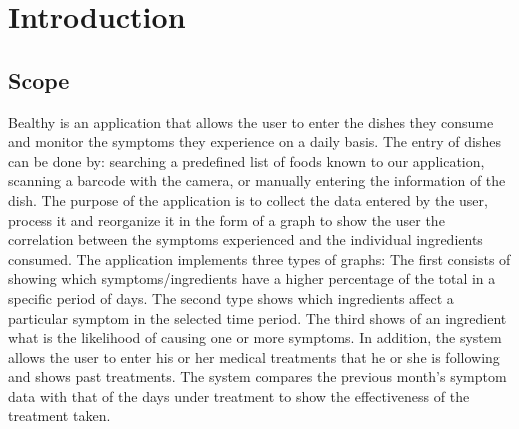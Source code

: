 \documentclass [12pt]{article}
\begin{document}
\clearpage

\tableofcontents

\section{Introduction}
\subsection{Scope}
Bealthy is an application that allows the user to enter the dishes they consume and monitor the symptoms they experience on a daily basis. 
The entry of dishes can be done by: searching a predefined list of foods known to our application, scanning a barcode with the camera, or manually entering the information of the dish.
The purpose of the application is to collect the data entered by the user, process it and reorganize it in the form of a graph to show the user the correlation between the symptoms experienced and the individual ingredients consumed.
The application implements three types of graphs:
The first consists of showing which symptoms/ingredients have a higher percentage of the total in a specific period of days.
The second type shows which ingredients affect a particular symptom in the selected time period.
The third shows of an ingredient what is the likelihood of causing one or more symptoms.
In addition, the system allows the user to enter his or her medical treatments that he or she is following and shows past treatments.
The system compares the previous month's symptom data with that of the days under treatment to show the effectiveness of the treatment taken.
\end{document}
